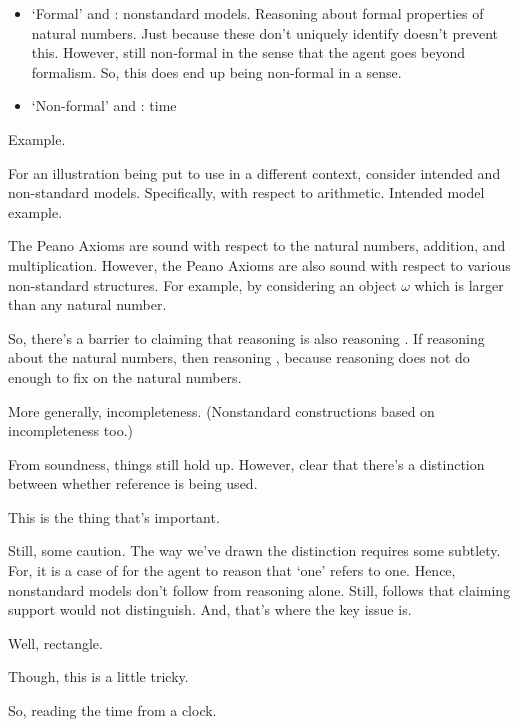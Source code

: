 \begin{note}
  \begin{itemize}
  \item `Formal' and \ur{}: nonstandard models. Reasoning about formal properties of natural numbers. Just because these don't uniquely identify doesn't prevent this.
    However, still non-formal in the sense that the agent goes beyond formalism.
    So, this does end up being non-formal in a sense.
  \item `Non-formal' and \nr{}: time
  \end{itemize}
\end{note}

\begin{note}
  Example.

  For an illustration being put to use in a different context, consider intended and non-standard models.
  Specifically, with respect to arithmetic.
  Intended model example.

  The Peano Axioms are sound with respect to the natural numbers, addition, and multiplication.
  However, the Peano Axioms are also sound with respect to various non-standard structures.
  For example, by considering an object \(\omega\) which is larger than any natural number.

  So, there's a barrier to claiming that reasoning \nr{} is also reasoning \ur{}.
  If reasoning about the natural numbers, then reasoning \ur{}, because reasoning \nr{} does not do enough to fix on the natural numbers.

  More generally, incompleteness.
  (Nonstandard constructions based on incompleteness too.)

  From soundness, things still hold up.
  However, clear that there's a distinction between whether reference is being used.

  This is the thing that's important.

  Still, some caution.
  The way we've drawn the distinction requires some subtlety.
  For, it is a case of \nr{} for the agent to reason that `one' refers to one.
  Hence, nonstandard models don't follow from \nr{} reasoning alone.
  Still, follows that claiming support would not distinguish.
  And, that's where the key issue is.
\end{note}

\begin{note}
  Well, rectangle.

  Though, this is a little tricky.

  So, reading the time from a clock.
\end{note}



